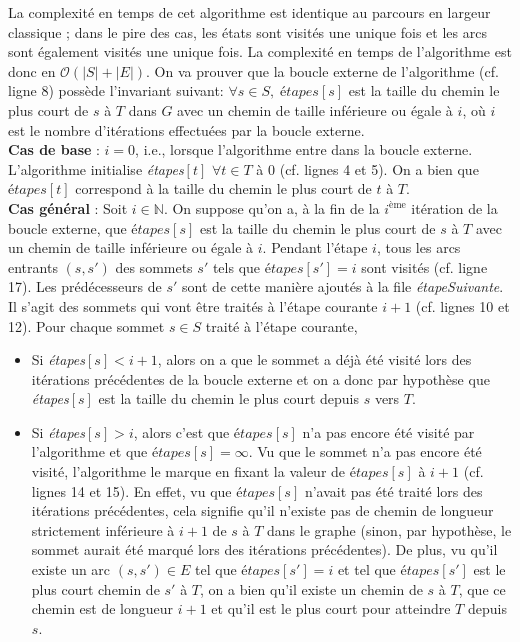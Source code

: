 \documentclass[12pt,a4paper]{report}
\theoremstyle{definition}%
\theoremstyle{remark}
\begin{document}
La complexité en temps de cet algorithme est identique au parcours en largeur
classique ; dans le pire des cas, les états sont visités une unique fois et
les arcs sont également visités une unique fois. La complexité en temps de
l'algorithme est donc en $\mathcal{O}(|S| + |E|)$. On va prouver que la boucle
externe de l'algorithme (cf. ligne 8) possède l'invariant suivant:
$\forall s \in S, \; \textit{étapes}[s]$ est la taille du chemin le plus court de $s$ à
$T$ dans $G$ avec un chemin de taille inférieure ou égale à $i$, où $i$ est
le nombre d'itérations effectuées par la boucle externe. \\
	\textbf{Cas de base} : $i = 0$, i.e., lorsque l'algorithme entre dans
		la boucle externe. L'algorithme initialise \textit{étapes}$[t]$ $\forall t \in T$ à $0$ (cf. lignes 4 et 5). On a bien que $\textit{étapes}[t]$
		correspond à la taille du chemin le plus court de $t$ à $T$. \\
	\textbf{Cas général} : Soit $i \in \mathbb{N}$. On suppose qu'on a, à la fin
		de la $i^{\text{ème}}$ itération de la boucle externe, que
		$\textit{étapes}[s]$ est la taille du chemin le plus court de $s$ à $T$ avec un
		chemin de taille inférieure ou égale à $i$. Pendant l'étape $i$, tous les
		arcs entrants $(s, s')$ des sommets $s'$ tels que $\textit{étapes}[s'] =
		i$ sont visités (cf. ligne 17). Les prédécesseurs de $s'$ sont de cette
		manière ajoutés à la file \textit{étapeSuivante}. Il s'agit des sommets
		qui vont être traités à l'étape courante $i+1$ (cf. lignes 10 et 12).
		Pour chaque sommet $s \in S$ traité à l'étape courante,
		\begin{itemize}
			\item Si \textit{étapes}$[s] < i + 1$, alors on a que le sommet a déjà
				été visité lors des itérations précédentes de la boucle externe et on
				a donc par hypothèse que \textit{étapes}$[s]$ est la taille du chemin le plus
				court depuis $s$ vers $T$.
			\item Si \textit{étapes}$[s] > i$, alors c'est que $\textit{étapes}[s]$
				n'a pas encore été visité par l'algorithme et que $\textit{étapes}[s] = \infty$.
				Vu que le sommet n'a pas encore été visité, l'algorithme le marque en
				fixant la valeur de $\textit{étapes}[s]$ à $i + 1$ (cf. lignes 14
				et 15). En effet, vu que $\textit{étapes}[s]$ n'avait pas été traité
				lors des itérations précédentes, cela signifie qu'il n'existe pas de
				chemin de longueur strictement inférieure à $i+1$ de $s$ à $T$ dans le graphe
				(sinon, par hypothèse, le sommet aurait été marqué lors des itérations précédentes).
				De plus, vu qu'il existe un arc $(s, s') \in E$ tel que
				$\textit{étapes}[s'] = i$ et tel que $\textit{étapes}[s']$ est le plus
				court chemin de $s'$ à $T$, on a bien qu'il existe un chemin de $s$ à
				$T$, que ce chemin est de longueur $i + 1$ et qu'il est le
				plus court pour atteindre $T$ depuis $s$.
		\end{itemize}
\end{document}
